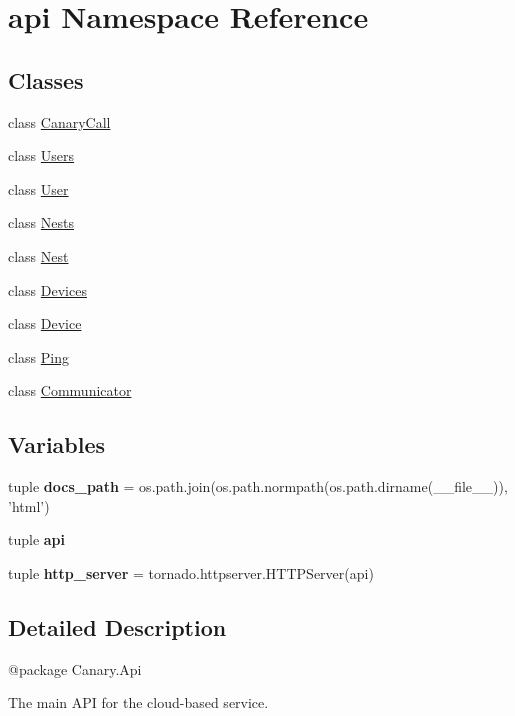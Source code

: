 \hypertarget{namespaceapi}{\section{api Namespace Reference}
\label{namespaceapi}
}
\subsection*{Classes}
\begin{DoxyCompactItemize}
\item 
class \hyperlink{classapi_1_1_canary_call}{Canary\-Call}
\item 
class \hyperlink{classapi_1_1_users}{Users}
\item 
class \hyperlink{classapi_1_1_user}{User}
\item 
class \hyperlink{classapi_1_1_nests}{Nests}
\item 
class \hyperlink{classapi_1_1_nest}{Nest}
\item 
class \hyperlink{classapi_1_1_devices}{Devices}
\item 
class \hyperlink{classapi_1_1_device}{Device}
\item 
class \hyperlink{classapi_1_1_ping}{Ping}
\item 
class \hyperlink{classapi_1_1_communicator}{Communicator}
\end{DoxyCompactItemize}
\subsection*{Variables}
\begin{DoxyCompactItemize}
\item 
\hypertarget{namespaceapi_a2f17f16e9a16d12c2728ab2815a1f6ef}{tuple {\bfseries docs\-\_\-path} = os.\-path.\-join(os.\-path.\-normpath(os.\-path.\-dirname(\-\_\-\-\_\-file\-\_\-\-\_\-)), 'html')}\label{namespaceapi_a2f17f16e9a16d12c2728ab2815a1f6ef}

\item 
tuple {\bfseries api}
\item 
\hypertarget{namespaceapi_a1125afafaabf4d39e0f633946f62eecd}{tuple {\bfseries http\-\_\-server} = tornado.\-httpserver.\-H\-T\-T\-P\-Server(api)}\label{namespaceapi_a1125afafaabf4d39e0f633946f62eecd}

\end{DoxyCompactItemize}


\subsection{Detailed Description}
\begin{DoxyVerb}@package Canary.Api

The main API for the cloud-based service.
\end{DoxyVerb}
 

